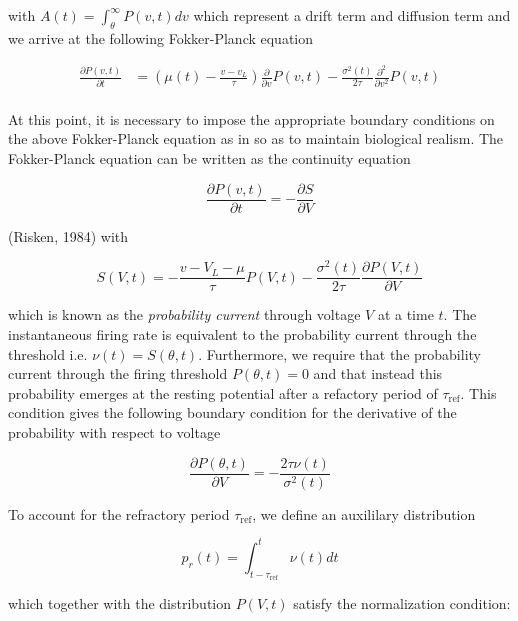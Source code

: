 \documentclass{ucetd}
\begin{document}
with $A(t) = \int_{\theta}^{\infty} P(v,t)dv$ which represent a drift term and diffusion term and we arrive at the following Fokker-Planck equation

\begin{align*}
\frac{\partial P(v,t)}{\partial t} &= \left(\mu(t) - \frac{v-v_{L}}{\tau}\right) \frac{\partial}{\partial v} P(v,t) - \frac{\sigma^{2}(t)}{2\tau}\frac{\partial^{2}}{\partial v^{2}} P(v,t)\\
\end{align*} 

At this point, it is necessary to impose the appropriate boundary conditions on the above Fokker-Planck equation as in so as to maintain biological realism. The Fokker-Planck equation can be written as the continuity equation 

\begin{equation*}
\frac{\partial P(v,t)}{\partial t} = -\frac{\partial S}{\partial V}
\end{equation*}

(Risken, 1984) with 

\begin{equation*}
S(V,t) = -\frac{v-V_{L}-\mu}{\tau}P(V,t) - \frac{\sigma^{2}(t)}{2\tau}\frac{\partial P(V,t)}{\partial V}
\end{equation*}

which is known as the \emph{probability current} through voltage $V$ at a time $t$. The instantaneous firing rate is equivalent to the probability current through the threshold i.e. $\nu(t) = S(\theta,t)$. Furthermore, we require that the probability current through the firing threshold $P(\theta, t)=0$ and that instead this probability emerges at the resting potential after a refactory period of $\tau_{\mathrm{ref}}$. This condition gives the following boundary condition for the derivative of the probability with respect to voltage

\begin{equation*}
\frac{\partial P(\theta,t)}{\partial V} = -\frac{2\tau\nu(t)}{\sigma^{2}(t)}
\end{equation*}

To account for the refractory period $\tau_{\mathrm{ref}}$, we define an auxililary distribution

\begin{equation*}
p_{r}(t) = \int_{t-\tau_{\mathrm{ref}}}^{t} \nu(t)dt
\end{equation*}

which together with the distribution $P(V,t)$ satisfy the normalization condition:
\end{document}
